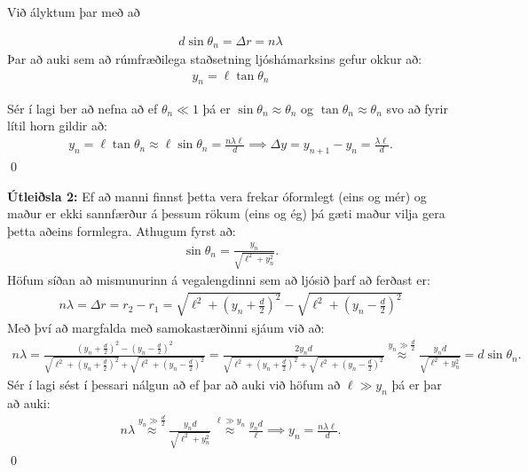 Við ályktum þar með að 

\begin{align*}
    d\sin\theta_n = \Delta r = n \lambda
\end{align*}
Þar að auki sem að rúmfræðilega staðsetning ljóshámarksins gefur okkur að:
\begin{align*}
    y_n = \ell \tan\theta_n
\end{align*}

Sér í lagi ber að nefna að ef $\theta_n \ll 1$ þá er $\sin\theta_n \approx \theta_n$ og $\tan\theta_n \approx \theta_n$ svo að fyrir lítil horn gildir að:
\begin{align*}
    y_n = \ell \tan\theta_n \approx \ell \sin\theta_n = \frac{n\lambda \ell}{d} \implies \Delta y = y_{n+1} - y_n = \frac{\lambda \ell}{d}.
\end{align*}
\qed



\textbf{Útleiðsla 2:} Ef að manni finnst þetta vera frekar óformlegt (eins og mér) og maður er ekki sannfærður á þessum rökum (eins og ég) þá gæti maður vilja gera þetta aðeins formlegra. Athugum fyrst að:
\begin{align*}
    \sin\theta_n = \frac{y_n}{\sqrt{\ell^2 + y_n^2}}.
\end{align*}
Höfum síðan að mismunurinn á vegalengdinni sem að ljósið þarf að ferðast er:
\begin{align*}
   n\lambda = \Delta r = r_2 - r_1 = \sqrt{\ell^2 + \left(y_n+\frac{d}{2}\right)^2} - \sqrt{\ell^2 + \left(y_n-\frac{d}{2}\right)^2}
\end{align*}
Með því að margfalda með samokastærðinni sjáum við að:
\begin{align*}
    n\lambda = \frac{\left(y_n + \frac{d}{2} \right)^2 - \left( y_n - \frac{d}{2} \right)^2}{\sqrt{\ell^2 + \left(y_n+\frac{d}{2}\right)^2} + \sqrt{\ell^2 + \left(y_n-\frac{d}{2}\right)^2}} = \frac{2y_n d}{\sqrt{\ell^2 + \left(y_n+\frac{d}{2}\right)^2} + \sqrt{\ell^2 + \left(y_n-\frac{d}{2}\right)^2}} \stackrel{y_n \gg \frac{d}{2}}{\approx} \frac{y_n d}{\sqrt{\ell^2 + y_n^2}} = d\sin\theta_n.
\end{align*}
Sér í lagi sést í þessari nálgun að ef þar að auki við höfum að $\ell \gg y_n$ þá er þar að auki:
\begin{align*}
    n \lambda \stackrel{y_n \gg \frac{d}{2}}{\approx} \frac{y_n d}{\sqrt{\ell^2 + y_n^2}} \stackrel{\ell \gg y_n}{\approx} \frac{y_n d}{\ell} \implies y_n = \frac{n\lambda \ell}{d}.
\end{align*}
\qed

